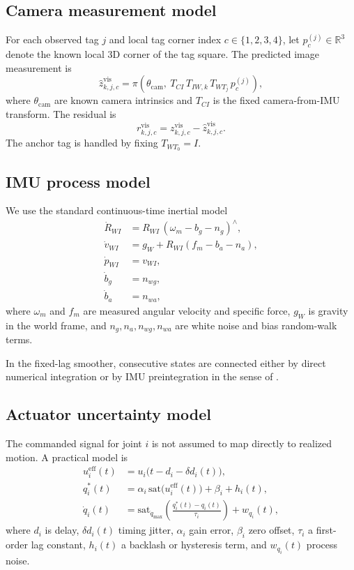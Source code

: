 \documentclass[11pt]{article}
\newcommand{\R}{\mathbb{R}}
\begin{document}
\subsection{Camera measurement model}
For each observed tag $j$ and local tag corner index $c\in\{1,2,3,4\}$, let $p^{(j)}_c\in\R^3$ denote the known local 3D corner of the tag square. The predicted image measurement is
\begin{equation}
    \hat{z}^{\mathrm{vis}}_{k,j,c} = \pi\!\left(\theta_{\mathrm{cam}},\ T_{CI}\, T_{IW,k}\, T_{WT_j}\, p^{(j)}_c\right),
\end{equation}
where $\theta_{\mathrm{cam}}$ are known camera intrinsics and $T_{CI}$ is the fixed camera-from-IMU transform. The residual is
\begin{equation}
    r^{\mathrm{vis}}_{k,j,c} = z^{\mathrm{vis}}_{k,j,c} - \hat{z}^{\mathrm{vis}}_{k,j,c}.
\end{equation}
The anchor tag is handled by fixing $T_{WT_0}=I$.

\subsection{IMU process model}
We use the standard continuous-time inertial model
\begin{align}
    \dot{R}_{WI} &= R_{WI}\, (\omega_m - b_g - n_g)^\wedge,\\
    \dot{v}_{WI} &= g_W + R_{WI}(f_m - b_a - n_a),\\
    \dot{p}_{WI} &= v_{WI},\\
    \dot{b}_g &= n_{wg},\\
    \dot{b}_a &= n_{wa},
\end{align}
where $\omega_m$ and $f_m$ are measured angular velocity and specific force, $g_W$ is gravity in the world frame, and $n_g,n_a,n_{wg},n_{wa}$ are white noise and bias random-walk terms.

In the fixed-lag smoother, consecutive states are connected either by direct numerical integration or by IMU preintegration in the sense of \citet{forster2017preintegration}.

\subsection{Actuator uncertainty model}
The commanded signal for joint $i$ is not assumed to map directly to realized motion. A practical model is
\begin{align}
    u^{\mathrm{eff}}_i(t) &= u_i\big(t - d_i - \delta d_i(t)\big),\\
    q_i^*(t) &= \alpha_i\,\mathrm{sat}\big(u^{\mathrm{eff}}_i(t)\big) + \beta_i + h_i(t),\\
    \dot{q}_i(t) &= \mathrm{sat}_{\dot{q}_{\max}}\!\left(\frac{q_i^*(t)-q_i(t)}{\tau_i}\right) + w_{q_i}(t),
\end{align}
where $d_i$ is delay, $\delta d_i(t)$ timing jitter, $\alpha_i$ gain error, $\beta_i$ zero offset, $\tau_i$ a first-order lag constant, $h_i(t)$ a backlash or hysteresis term, and $w_{q_i}(t)$ process noise.
\end{document}

